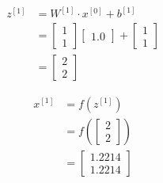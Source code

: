 \documentclass[12pt]{article}
\begin{document}
\begin{enumerate}[leftmargin=\labelsep]
\begin{paracol}{3}
              $$
                  \begin{aligned}
                      z^{[1]} & = W^{[1]} \cdot x^{[0]} + b^{[1]} \\
                              & = \begin{bmatrix}
                                      1 \\
                                      1
                                  \end{bmatrix}
                      \begin{bmatrix}
                          1.0
                      \end{bmatrix}
                      +
                      \begin{bmatrix}
                          1 \\
                          1
                      \end{bmatrix}                              \\
                              & = \begin{bmatrix}{}
                                      2 \\
                                      2
                                  \end{bmatrix}
                  \end{aligned}
              $$

              $$
                  \begin{aligned}
                      x^{[1]} & = f(z^{[1]})                  \\
                              & = f\left(\begin{bmatrix}{}
                                                 2 \\
                                                 2
                                             \end{bmatrix}\right) \\
                              & = \begin{bmatrix}{}
                                      1.2214 \\
                                      1.2214
                                  \end{bmatrix}
                  \end{aligned}
              $$


\end{paracol}
\end{enumerate}
\end{document}
